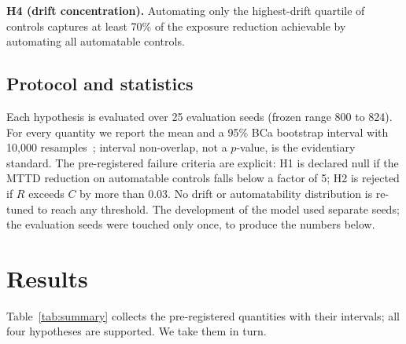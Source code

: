 \documentclass[journal]{IEEEtran}
\begin{document}
\textbf{H4 (drift concentration).} Automating only the highest-drift quartile of controls captures
at least 70\% of the exposure reduction achievable by automating all automatable controls.

\subsection{Protocol and statistics}
Each hypothesis is evaluated over 25 evaluation seeds (frozen range 800 to 824). For every
quantity we report the mean and a 95\% BCa bootstrap interval with 10{,}000
resamples~\cite{efron1987bca,efron1994introduction}; interval non-overlap, not a $p$-value, is the
evidentiary standard. The pre-registered failure criteria are explicit: H1 is declared null if the
MTTD reduction on automatable controls falls below a factor of 5; H2 is rejected if $R$ exceeds $C$
by more than 0.03. No drift or automatability distribution is re-tuned to reach any threshold. The
development of the model used separate seeds; the evaluation seeds were touched only once, to
produce the numbers below.

\section{Results}
Table~\ref{tab:summary} collects the pre-registered quantities with their intervals; all four
hypotheses are supported. We take them in turn.

\begin{table}[t]
\centering
\caption{Pre-registered quantities (mean over 25 seeds, 95\% BCa interval).}
\label{tab:summary}
\footnotesize
\setlength{\tabcolsep}{4pt}
\end{table}
\end{document}
